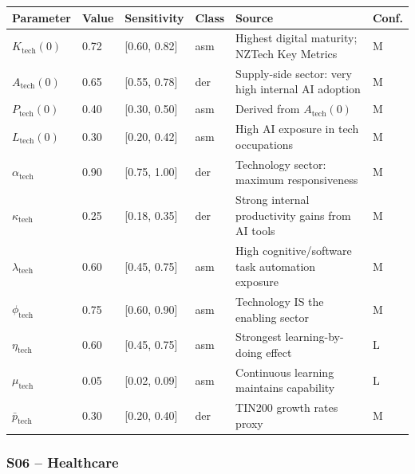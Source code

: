 \documentclass[11pt,a4paper]{article}
\begin{document}
\begin{center}
\begin{tabular}{llllll}
\toprule
Parameter & Value & Sensitivity & Class & Source & Conf.\\
\midrule
$K_{\text{tech}}(0)$ & 0.72 & [0.60, 0.82] & asm & Highest digital maturity; NZTech Key Metrics & M \\
$A_{\text{tech}}(0)$ & 0.65 & [0.55, 0.78] & der & Supply-side sector: very high internal AI adoption & M \\
$P_{\text{tech}}(0)$ & 0.40 & [0.30, 0.50] & asm & Derived from $A_{\text{tech}}(0)$ & M \\
$L_{\text{tech}}(0)$ & 0.30 & [0.20, 0.42] & asm & High AI exposure in tech occupations & M \\
$\alpha_{\text{tech}}$ & 0.90 & [0.75, 1.00] & der & Technology sector: maximum responsiveness & M \\
$\kappa_{\text{tech}}$ & 0.25 & [0.18, 0.35] & der & Strong internal productivity gains from AI tools & M \\
$\lambda_{\text{tech}}$ & 0.60 & [0.45, 0.75] & asm & High cognitive/software task automation exposure & M \\
$\phi_{\text{tech}}$ & 0.75 & [0.60, 0.90] & asm & Technology IS the enabling sector & M \\
$\eta_{\text{tech}}$ & 0.60 & [0.45, 0.75] & asm & Strongest learning-by-doing effect & L \\
$\mu_{\text{tech}}$ & 0.05 & [0.02, 0.09] & asm & Continuous learning maintains capability & L \\
$\bar{p}_{\text{tech}}$ & 0.30 & [0.20, 0.40] & der & TIN200 growth rates proxy & M \\
\bottomrule
\end{tabular}
\end{center}

\subsubsection*{S06 -- Healthcare}
\end{document}
